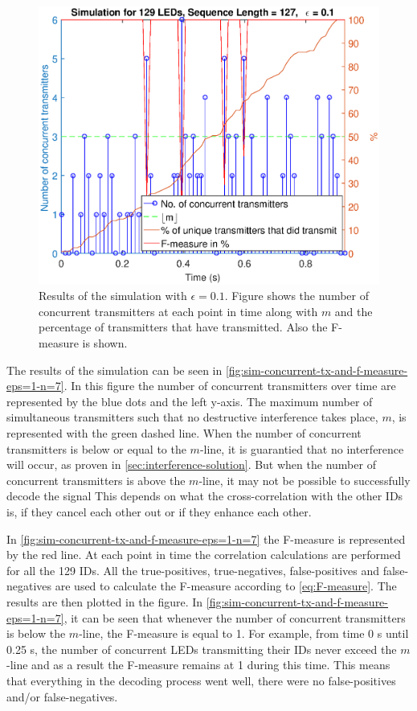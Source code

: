 \begin{figure}[ht]
	\centering
	\includegraphics[width=\textwidth]{chapters/evaluation-chapters/simulation/sim-concurrent-tx-and-f-measure-eps=1-n=7.eps}
	\caption{Results of the simulation with $\epsilon = 0.1$. Figure shows the number of concurrent transmitters at each point in time along with $m$ and the percentage of transmitters that have transmitted. Also the F-measure is shown.}
	\label{fig:sim-concurrent-tx-and-f-measure-eps=1-n=7}
\end{figure}



The results of the simulation can be seen in \autoref{fig:sim-concurrent-tx-and-f-measure-eps=1-n=7}.
In this figure the number of concurrent transmitters over time are represented by the blue dots and the left y-axis.
The maximum number of simultaneous transmitters such that no destructive interference takes place, $m$, is represented with the green dashed line.
When the number of concurrent transmitters is below or equal to the $m$-line, it is guarantied that no interference will occur, as proven in \autoref{sec:interference-solution}.
But when the number of concurrent transmitters is above the $m$-line, it may not be possible to successfully decode the signal
This depends on what the cross-correlation with the other IDs is, if they cancel each other out or if they enhance each other.

In \autoref{fig:sim-concurrent-tx-and-f-measure-eps=1-n=7} the F-measure is represented by the red line.
At each point in time the correlation calculations are performed for all the 129 IDs.
All the true-positives, true-negatives, false-positives and false-negatives are used to calculate the F-measure according to \autoref{eq:F-measure}.
The results are then plotted in the figure.
In \autoref{fig:sim-concurrent-tx-and-f-measure-eps=1-n=7}, it can be seen that whenever the number of concurrent transmitters is below the $m$-line, the F-measure is equal to 1.
For example, from time 0 s until 0.25 s, the number of concurrent LEDs transmitting their IDs never exceed the $m$-line and as a result the F-measure remains at 1 during this time.
This means that everything in the decoding process went well, there were no false-positives and/or false-negatives.

